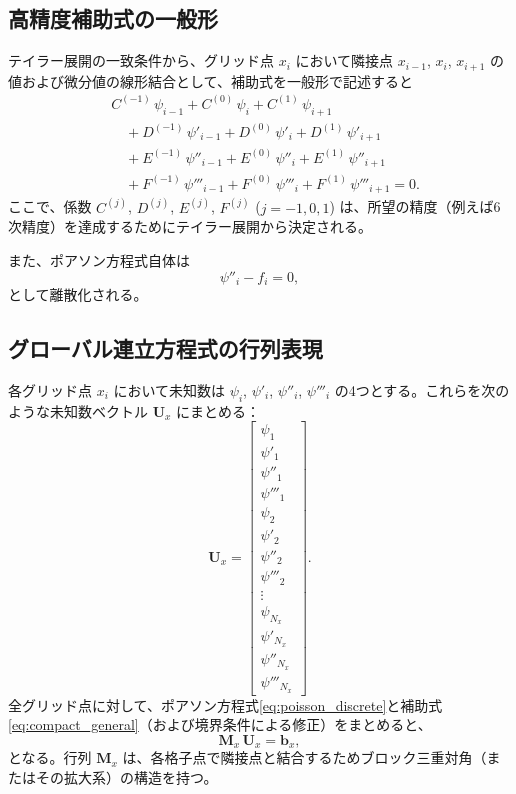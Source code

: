 \documentclass[11pt]{article}
\begin{document}
\subsection{高精度補助式の一般形}
テイラー展開の一致条件から、グリッド点 $x_i$ において隣接点 $x_{i-1}$, $x_i$, $x_{i+1}$ の値および微分値の線形結合として、補助式を一般形で記述すると
\begin{align}
  & C^{(-1)}\,\psi_{i-1} + C^{(0)}\,\psi_i + C^{(1)}\,\psi_{i+1} \nonumber \\
  & \quad + D^{(-1)}\,\psi'_{i-1} + D^{(0)}\,\psi'_i + D^{(1)}\,\psi'_{i+1} \nonumber \\
  & \quad + E^{(-1)}\,\psi''_{i-1} + E^{(0)}\,\psi''_i + E^{(1)}\,\psi''_{i+1} \nonumber \\
  & \quad + F^{(-1)}\,\psi'''_{i-1} + F^{(0)}\,\psi'''_i + F^{(1)}\,\psi'''_{i+1} = 0.
  \label{eq:compact_general}
\end{align}
ここで、係数 $C^{(j)}$, $D^{(j)}$, $E^{(j)}$, $F^{(j)}$ ($j=-1,0,1$) は、所望の精度（例えば6次精度）を達成するためにテイラー展開から決定される。\newline

また、ポアソン方程式自体は
\begin{equation}
  \psi''_i - f_i = 0,
  \label{eq:poisson_discrete}
\end{equation}
として離散化される。

\subsection{グローバル連立方程式の行列表現}
各グリッド点 $x_i$ において未知数は $\psi_i$, $\psi'_i$, $\psi''_i$, $\psi'''_i$ の4つとする。これらを次のような未知数ベクトル $\mathbf{U}_x$ にまとめる：
\begin{equation}
  \mathbf{U}_x = \begin{bmatrix}
    \psi_1 \\ \psi'_1 \\ \psi''_1 \\ \psi'''_1 \\ \psi_2 \\ \psi'_2 \\ \psi''_2 \\ \psi'''_2 \\ \vdots \\ \psi_{N_x} \\ \psi'_{N_x} \\ \psi''_{N_x} \\ \psi'''_{N_x}
  \end{bmatrix}.
\end{equation}
全グリッド点に対して、ポアソン方程式\eqref{eq:poisson_discrete}と補助式\eqref{eq:compact_general}（および境界条件による修正）をまとめると、
\begin{equation}
  \mathbf{M}_x \,\mathbf{U}_x = \mathbf{b}_x,
\end{equation}
となる。行列 $\mathbf{M}_x$ は、各格子点で隣接点と結合するためブロック三重対角（またはその拡大系）の構造を持つ。
\end{document}
